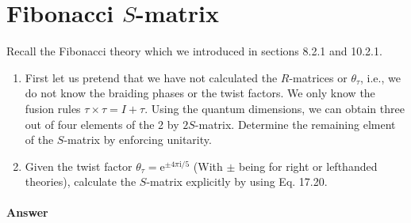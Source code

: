 
\section{Fibonacci $S$-matrix}
Recall the Fibonacci theory which we introduced in sections 8.2.1 and 10.2.1.
\begin{enumerate}
\item First let us pretend that we have not calculated the $R$-matrices or $\theta _{\tau }$, i.e., we do not know the braiding phases or the twist factors. We only know the fusion rules $\tau \times \tau =I+\tau $. Using the quantum dimensions, we can obtain three out of four elements of the 2 by $2S$-matrix. Determine the remaining elment of the $S$-matrix by enforcing unitarity.
\item Given the twist factor $\theta _{\tau } =\mathrm{e}^{\pm 4\pi \mathrm{i} /5}$ (With $\pm $ being for right or lefthanded theories), calculate the $S$-matrix explicitly by using Eq. 17.20.
\end{enumerate}

\paragraph{Answer}

